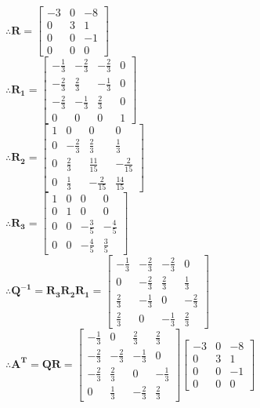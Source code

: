 \documentclass[english,onecolumn]{IEEEtran}
\begin{document}
\begin{enumerate}
    $\therefore    \mathbf{R} =
    \begin{bmatrix}
        -3 & 0 & -8  \\
        0 & 3 & 1 \\
        0 & 0 & -1 \\
        0 & 0 & 0
    \end{bmatrix}
    $\\
    $\therefore  \mathbf{R_1} = \begin{bmatrix}
        -\frac{1}{3} & -\frac{2}{3} & -\frac{2}{3} & 0 \\
        -\frac{2}{3} & \frac{2}{3} & -\frac{1}{3} & 0 \\
        -\frac{2}{3} & -\frac{1}{3} & \frac{2}{3} & 0 \\
        0 & 0 & 0 & 1
    \end{bmatrix}$\\
    $\therefore 
    \mathbf{R_2} = \begin{bmatrix}
        1 & 0 & 0 & 0 \\
        0 & -\frac{2}{3} & \frac{2}{3} & \frac{1}{3} \\
        0 & \frac{2}{3} & \frac{11}{15} & -\frac{2}{15} \\
        0 & \frac{1}{3} & -\frac{2}{15} & \frac{14}{15}
    \end{bmatrix}$\\
    $\therefore 
    \mathbf{R_3} = \begin{bmatrix}
        1 & 0 & 0 & 0 \\
        0 & 1 & 0 & 0 \\
        0 & 0 & -\frac{3}{5} & -\frac{4}{5}\\
        0 & 0 & -\frac{4}{5} & \frac{3}{5}
    \end{bmatrix}$\\
    $\therefore   \mathbf{Q^{-1} = R_3 R_2 R_1 } = 
    \begin{bmatrix}
        -\frac{1}{3} & -\frac{2}{3} & -\frac{2}{3} & 0 \\
        0 & -\frac{2}{3} & \frac{2}{3} & \frac{1}{3} \\
        \frac{2}{3} & -\frac{1}{3} & 0 & -\frac{2}{3} \\
        \frac{2}{3} & 0 & -\frac{1}{3} & \frac{2}{3}
    \end{bmatrix}
    $\\
    $\therefore    \mathbf{A^T = Q R } = 
    \begin{bmatrix}
        -\frac{1}{3} & 0 & \frac{2}{3} & \frac{2}{3} \\
        -\frac{2}{3} & -\frac{2}{3} & -\frac{1}{3} & 0 \\
        -\frac{2}{3} & \frac{2}{3} & 0 & -\frac{1}{3} \\
        0 & \frac{1}{3} & -\frac{2}{3} & \frac{2}{3}
    \end{bmatrix}
    \begin{bmatrix}
        -3 & 0 & -8  \\
        0 & 3 & 1 \\
        0 & 0 & -1 \\
        0 & 0 & 0
    \end{bmatrix}
    $\\
    

\end{enumerate}
\end{document}

